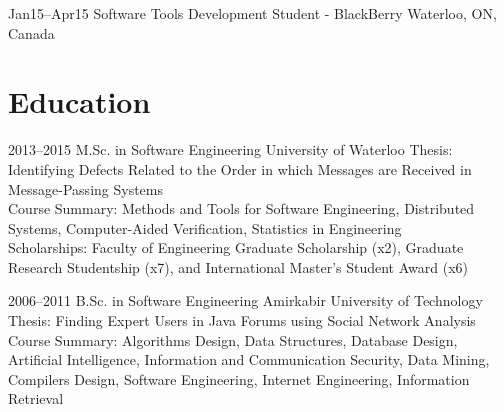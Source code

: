 \documentclass[]{cv-style}                     %
\begin{document}
\begin{entrylist}
  \entry
  {\small Jan15--Apr15}
  {Software Tools Development Student - BlackBerry}
  {Waterloo, ON, Canada}



\end{entrylist}



\newpage
\section{Education}

\begin{entrylist}

  \entry
  {\small 2013--2015}
  {M.Sc. in Software Engineering {\normalfont [GPA: 87.80/100]}}
  {University of Waterloo}
  {Thesis: Identifying Defects Related to the Order in which Messages are Received in Message-Passing Systems \\
   Course Summary: Methods and Tools for Software Engineering, Distributed Systems, Computer-Aided Verification, Statistics in Engineering \\
   Scholarships: Faculty of Engineering Graduate Scholarship (x2), Graduate Research Studentship (x7), and International Master's Student Award (x6)}

  \entry
  {\small 2006--2011}
  {B.Sc. in Software Engineering {\normalfont [GPA: 16.69/20]}}
  {Amirkabir University of Technology}
  {Thesis: Finding Expert Users in Java Forums using Social Network Analysis \\
   Course Summary: Algorithms Design, Data Structures, Database Design, Artificial Intelligence, Information and Communication Security, Data Mining, Compilers Design, Software Engineering, Internet Engineering, Information Retrieval}

\end{entrylist}


\end{document}
